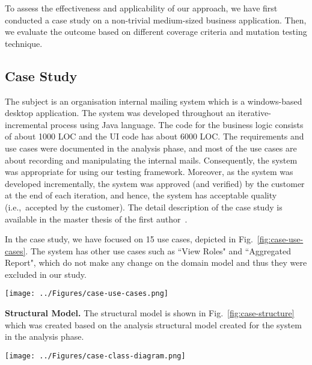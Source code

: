 %
%
\label{sec:evaluation}
To assess the effectiveness and applicability of our approach, we have first conducted a case study on a non-trivial medium-sized business application. Then, we evaluate the outcome based on different coverage criteria and mutation testing technique. 


\subsection{Case Study}
\label{sec:evaluation-case-study}
The subject is an organisation internal mailing system which is a windows-based desktop application. The system was developed throughout an iterative-incremental process using Java language. The code for the business logic consists of about 1000 LOC and the UI code has about 6000 LOC.
The requirements and use cases were documented in the analysis phase, and most of the use cases are about recording and manipulating the internal mails. Consequently, the system was appropriate for using our testing framework. Moreover, as the system was developed incrementally, the system was approved (and verified) by the customer at the end of each iteration, and  hence, the system has acceptable quality (i.e.,\ accepted by the customer).
The detail description of the case study is available in the master thesis of the first author~\cite{Jalalinasab2012b}. 

In the case study, we have focused on 15 use cases, depicted in Fig.~\ref{fig:case-use-cases}. The system has other use cases such as ``View Roles" and ``Aggregated Report", which do not make any change on the domain model and thus they were excluded in our study. 

\begin{figure*}[h]
\centering
\texttt{[image: ../Figures/case-use-cases.png]}
\caption{Use case diagram for the case study.}
\label{fig:case-use-cases}
\end{figure*}

\textbf{Structural Model.} The structural model is shown in Fig.~\ref{fig:case-structure} which was created based on the analysis structural model created for the system in the analysis phase.

\begin{figure*}[!t]
\centering
\texttt{[image: ../Figures/case-class-diagram.png]}%
\caption{Structural model of the case study.}
\label{fig:case-structure}
\end{figure*} 

